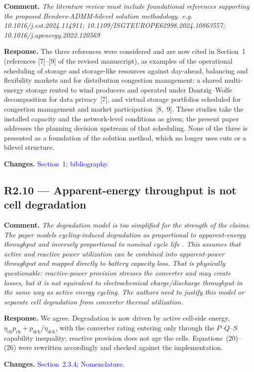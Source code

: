 \documentclass[11pt]{article}
\newcommand{\rcomment}[1]{\par\medskip\noindent\textbf{Comment.} \textit{#1}\par\smallskip}
\newcommand{\rresponse}[1]{\noindent\textbf{Response.} #1\par\smallskip}
\newcommand{\rchanges}[1]{\noindent\textbf{Changes.} \textcolor{blue}{#1}\par\medskip}
\begin{document}
\rcomment{
    The literature review must include foundational references supporting the proposed Benders-ADMM-bilevel solution methodology. e.g. 10.1016/j.est.2024.114911; 10.1109/ISGTEUROPE62998.2024.10863557; 10.1016/j.apenergy.2022.120569
}

\rresponse{
    The three references were considered and are now cited in Section~1 (references [7]--[9] of the revised manuscript), as examples of the operational scheduling of storage and storage-like resources against day-ahead, balancing and flexibility markets and for distribution congestion management: a shared multi-energy storage rented to wind producers and operated under Dantzig--Wolfe decomposition for data privacy~[7], and virtual storage portfolios scheduled for congestion management and market participation~[8,~9]. These studies take the installed capacity and the network-level conditions as given; the present paper addresses the planning decision upstream of that scheduling. None of the three is presented as a foundation of the solution method, which no longer uses cuts or a bilevel structure.
}

\rchanges{Section~1; bibliography.}

\subsection*{R2.10 --- Apparent-energy throughput is not cell degradation}
\rcomment{
The degradation model is too simplified for the strength of the claims. The paper models cycling-induced degradation as proportional to apparent-energy throughput and inversely proportional to nominal cycle life . This assumes that active and reactive power utilization can be combined into apparent-power throughput and mapped directly to battery capacity loss. That is physically questionable: reactive-power provision stresses the converter and may create losses, but it is not equivalent to electrochemical charge/discharge throughput in the same way as active energy cycling. The authors need to justify this model or separate cell degradation from converter thermal utilization.
}
\rresponse{We agree. Degradation is now driven by active cell-side energy,
$\eta_{\mathrm{ch}} p_{\mathrm{ch}} + p_{\mathrm{dch}}/\eta_{\mathrm{dch}}$, with the converter rating
entering only through the $P$--$Q$--$S$ capability inequality; reactive provision does not age the cells.
Equations~(20)--(26) were rewritten accordingly and checked against the implementation.}
\rchanges{Section~2.3.4; Nomenclature.}
\end{document}
